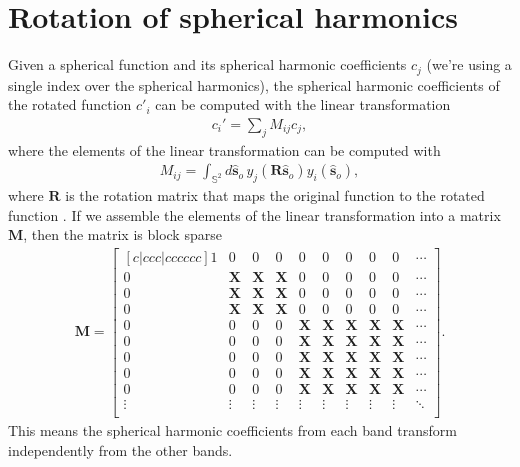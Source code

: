 \documentclass[11pt]{article}
\providecommand{\so}[1]{\mathbf{\hat{s}}_o}
\begin{document}
\appendix
\section{Rotation of spherical harmonics} \label{sec:sh}
Given a spherical function and its spherical harmonic coefficients $c_j$ (we're
using a single index over the spherical harmonics), the spherical harmonic
coefficients of the rotated function $c'_i$ can be computed with the linear
transformation
\begin{align}
  c_i' = \sum_j M_{ij}c_j, 
\end{align}
where the elements of the linear transformation can be computed with
\begin{align}
  M_{ij} = \int_{\mathbb{S}^2} d\so{}\, y_j(\mathbf{R}\so{})y_i(\so{}), 
\end{align}
where $\mathbf{R}$ is the rotation matrix that maps the original function to the
rotated function \cite{kautz2002}. If we assemble the elements of the linear transformation into
a matrix $\mathbf{M}$, then the matrix is block sparse
\begin{align}
  \mathbf{M} =
  \begin{bmatrix}[c|ccc|cccccc]    
    1&0&0&0&0&0&0&0&0&\cdots\\ \hline
    0&\mathbf{X}&\mathbf{X}&\mathbf{X}&0&0&0&0&0&\cdots\\
    0&\mathbf{X}&\mathbf{X}&\mathbf{X}&0&0&0&0&0&\cdots\\
    0&\mathbf{X}&\mathbf{X}&\mathbf{X}&0&0&0&0&0&\cdots\\ \hline
    0&0&0&0&\mathbf{X}&\mathbf{X}&\mathbf{X}&\mathbf{X}&\mathbf{X}&\cdots\\
    0&0&0&0&\mathbf{X}&\mathbf{X}&\mathbf{X}&\mathbf{X}&\mathbf{X}&\cdots\\
    0&0&0&0&\mathbf{X}&\mathbf{X}&\mathbf{X}&\mathbf{X}&\mathbf{X}&\cdots\\
    0&0&0&0&\mathbf{X}&\mathbf{X}&\mathbf{X}&\mathbf{X}&\mathbf{X}&\cdots\\
    0&0&0&0&\mathbf{X}&\mathbf{X}&\mathbf{X}&\mathbf{X}&\mathbf{X}&\cdots\\    
    \vdots&\vdots&\vdots&\vdots&\vdots&\vdots&\vdots&\vdots&\vdots&\ddots\\        
  \end{bmatrix}.
\end{align}
This means the spherical harmonic coefficients from each band transform
independently from the other bands.
\end{document}

